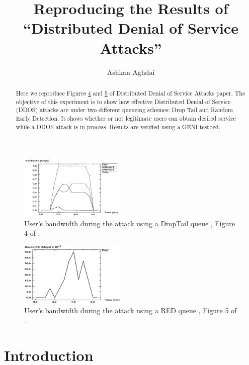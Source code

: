 \documentclass[12pt,twocolumn]{article}
\title{Reproducing the Results of\\``Distributed Denial of Service Attacks''}
\author{Ashkan Aghdai}
\begin{document}
\maketitle

\begin{abstract}

Here we reproduce Figures \hyperref[fig4]{4} and \hyperref[fig5]{5} of Distributed Denial of Service Attacks paper.
The objective of this experiment is to show how effective Distributed Denial of Service (DDOS) attacks are under two different queueing schemes: Drop Tail and Random Early Detection.
It shows whether or not legitimate users can obtain desired service while a DDOS attack is in process.
Results are verified using a GENI testbed.
\end{abstract}

\begin{figure}[b!]
    \centering
    \includegraphics[width=0.45\textwidth]{../Figures/fig4.png} \caption{User's bandwidth during the attack using a DropTail queue \cite{bertsekas1992data}, Figure 4 of \cite{lau2000distributed}.} \label{fig4}
\end{figure}

\begin{figure}[b!]
    \centering
    \includegraphics[width=0.45\textwidth]{../Figures/fig5.png} \caption{User's bandwidth during the attack using a RED queue \cite{floyd1993random}, Figure 5 of \cite{lau2000distributed}.} \label{fig5}
\end{figure}

\section{Introduction}
\end{document}
